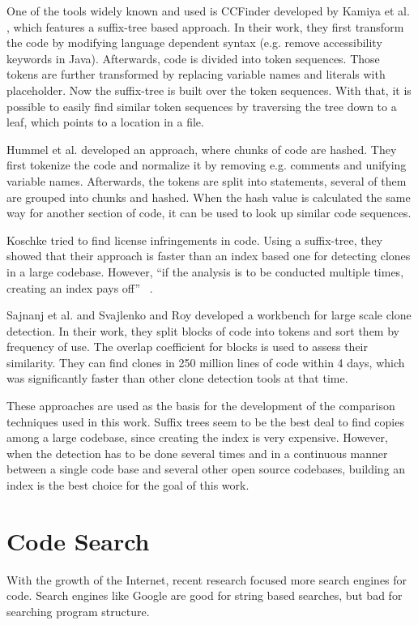 One of the tools widely known and used is CCFinder developed by Kamiya et al. \cite{kamiya2002ccfinder}, which features a suffix-tree based approach.
In their work, they first transform the code by modifying language dependent syntax (e.g. remove accessibility keywords in Java).
Afterwards, code is divided into token sequences.
Those tokens are further transformed by replacing variable names and literals with placeholder.
Now the suffix-tree is built over the token sequences. 
With that, it is possible to easily find similar token sequences by traversing the tree down to a leaf, which points to a location in a file.

Hummel et al. \cite{hummel2010index} developed an approach, where chunks of code are hashed.
They first tokenize the code and normalize it by removing e.g. comments and unifying variable names.
Afterwards, the tokens are split into statements, several of them are grouped into chunks and hashed.
When the hash value is calculated the same way for another section of code, it can be used to look up similar code sequences.

Koschke \cite{koschke2014large,koschke2012large} tried to find license infringements in code.
Using a suffix-tree, they showed that their approach is faster than an index based one for detecting clones in a large codebase.
However, ``if the analysis is to be conducted multiple times, creating an index pays off'' \ \cite{koschke2014large}.

Sajnanj et al. \cite{sajnani2016sourcerercc} and Svajlenko and Roy \cite{svajlenko2017fast} developed a workbench for large scale clone detection.
In their work, they split blocks of code into tokens and sort them by frequency of use.
The overlap coefficient for blocks is used to assess their similarity.
They can find clones in 250 million lines of code within 4 days, which was significantly faster than other clone detection tools at that time.

These approaches are used as the basis for the development of the comparison techniques used in this work.
Suffix trees seem to be the best deal to find copies among a large codebase, since creating the index is very expensive.
However, when the detection has to be done several times and in a continuous manner between a single code base and several other open source codebases, building an index is the best choice for the goal of this work.

\section{Code Search}\label{section:related_work/code_search}
With the growth of the Internet, recent research focused more search engines for code.
Search engines like Google are good for string based searches, but bad for searching program structure.

